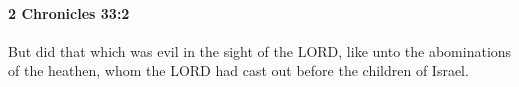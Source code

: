 
		\paragraph{2 Chronicles 33:2} %
			\label{2CHRONICLES-33-2}

			But did that which was evil in the sight of the LORD, like unto the abominations of the heathen, whom the LORD had cast out before the children of Israel.


